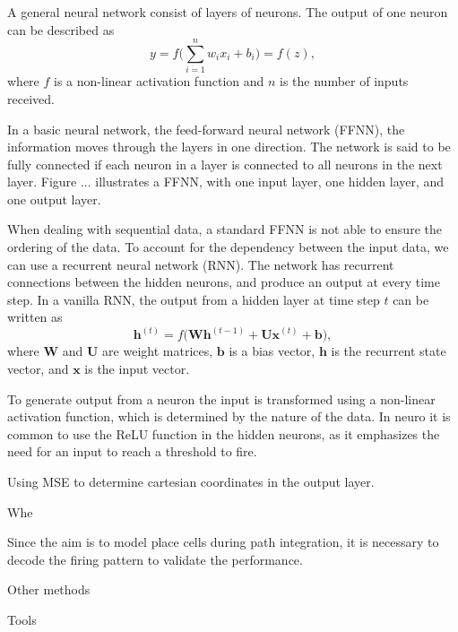 A general neural network consist of layers of neurons. The output of one neuron can be described as 
\begin{equation}
    y = f \bigg( \sum_{i=1}^{n} w_{i} x_{i} + b_{i} \bigg) = f(z),
\end{equation}
where $f$ is a non-linear activation function and $n$ is the number of inputs received. 

In a basic neural network, the feed-forward neural network (FFNN), the information moves through the layers in one direction. The network is said to be fully connected if each neuron in a layer is connected to all neurons in the next layer. Figure ... illustrates a FFNN, with one input layer, one hidden layer, and one output layer. 


When dealing with sequential data, a standard FFNN is not able to ensure the ordering of the data. To account for the dependency between the input data, we can use a recurrent neural network (RNN). The network has recurrent connections between the hidden neurons, and produce an output at every time step. In a vanilla RNN, the output from a hidden layer at time step $t$ can be written as 
\begin{equation}
    \mathbf{h}^{(t)} = f \bigg( \mathbf{Wh}^{(t-1)} + \mathbf{Ux}^{(t)} +  \mathbf{b} \bigg), 
\end{equation}
where $\mathbf{W}$ and $\mathbf{U}$ are weight matrices, $\mathbf{b}$ is a bias vector, $\mathbf{h}$ is the recurrent state vector, and $\mathbf{x}$ is the input vector.

To generate output from a neuron the input is transformed using a non-linear activation function, which is determined by the nature of the data. In neuro it is common to use the ReLU function in the hidden neurons, as it emphasizes the need for an input to reach a threshold to fire.

Using MSE to determine cartesian coordinates in the output layer.

Whe


Since the aim is to model place cells during path integration, it is necessary to decode the firing pattern to validate the performance. 

Other methods

Tools





